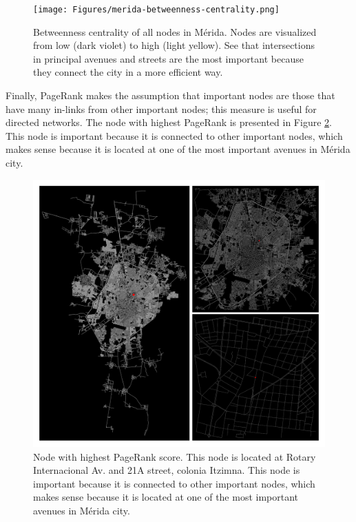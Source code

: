 \begin{figure}[htpb]
  \centering
  \texttt{[image: Figures/merida-betweenness-centrality.png]}
  \caption{Betweenness centrality of all nodes in Mérida. Nodes are visualized from low (dark violet) to high (light yellow). See that intersections in principal avenues and streets are the most important because they connect the city in a more efficient way.
    \label{fig:merida-betweenness-centrality}}
\end{figure}

Finally, PageRank makes the assumption that important nodes are those that have many in-links from other important nodes; this measure is useful for directed networks. The node with highest PageRank is presented in Figure \ref{fig:merida-max-node-pagerank}. This node is important because it is connected to other important nodes, which makes sense because it is located at one of the most important avenues in Mérida city.

\begin{figure}[htpb]
  \centering
  \includegraphics[width=1.0\textwidth]{Figures/merida-node-pagerank.png}
  \caption{Node with highest PageRank score. This node is located at Rotary Internacional Av. and 21A street, colonia Itzimna. This node is important because it is connected to other important nodes, which makes sense because it is located at one of the most important avenues in Mérida city.
    \label{fig:merida-max-node-pagerank}}
\end{figure}

